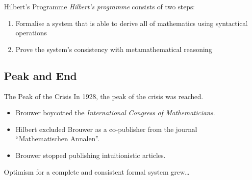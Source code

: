\documentclass{beamer}
\begin{document}
\begin{frame}{Hilbert's Programme}
\emph{Hilbert's programme} consists of two steps:
\pause
\begin{enumerate}[<+->]
	\item Formalise a system that is able to derive all of mathematics using syntactical operations
	\item Prove the system's consistency with metamathematical reasoning
\end{enumerate}
\end{frame}
\subsection{Peak and End}
\begin{frame}{The Peak of the Crisis}
In 1928, the peak of the crisis was reached.
\pause
    \begin{itemize}[<+->]
	\item Brouwer boycotted the \textit{International Congress of Mathematicians}.
	\item Hilbert excluded Brouwer as a co-publisher from the journal ``Mathematischen Annalen''.
	\item Brouwer stopped publishing intuitionistic articles.
    \end{itemize}
\pause[\thebeamerpauses]
Optimism for a complete and consistent formal system grew\ldots
\end{frame}
\end{document}
